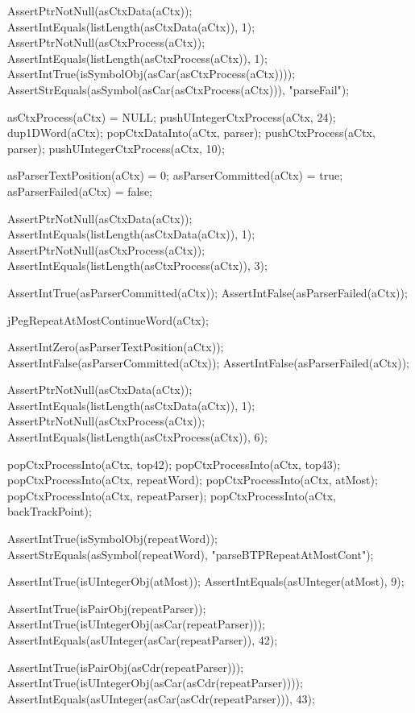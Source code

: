   AssertPtrNotNull(asCtxData(aCtx));
  AssertIntEquals(listLength(asCtxData(aCtx)), 1);
  AssertPtrNotNull(asCtxProcess(aCtx));
  AssertIntEquals(listLength(asCtxProcess(aCtx)), 1);
  AssertIntTrue(isSymbolObj(asCar(asCtxProcess(aCtx))));
  AssertStrEquals(asSymbol(asCar(asCtxProcess(aCtx))), "parseFail");
\stopCTest
\stopTestCase

\startCTest
  asCtxProcess(aCtx) = NULL;
  pushUIntegerCtxProcess(aCtx, 24);
  dup1DWord(aCtx);
  popCtxDataInto(aCtx, parser);
  pushCtxProcess(aCtx, parser);
  pushUIntegerCtxProcess(aCtx, 10);

  asParserTextPosition(aCtx) = 0;
  asParserCommitted(aCtx)    = true;
  asParserFailed(aCtx)       = false;
  
  AssertPtrNotNull(asCtxData(aCtx));
  AssertIntEquals(listLength(asCtxData(aCtx)), 1);
  AssertPtrNotNull(asCtxProcess(aCtx));
  AssertIntEquals(listLength(asCtxProcess(aCtx)), 3);
  
  AssertIntTrue(asParserCommitted(aCtx));
  AssertIntFalse(asParserFailed(aCtx));
  
  jPegRepeatAtMostContinueWord(aCtx);
  
  AssertIntZero(asParserTextPosition(aCtx));
  AssertIntFalse(asParserCommitted(aCtx));
  AssertIntFalse(asParserFailed(aCtx));
  
  AssertPtrNotNull(asCtxData(aCtx));
  AssertIntEquals(listLength(asCtxData(aCtx)), 1);
  AssertPtrNotNull(asCtxProcess(aCtx));
  AssertIntEquals(listLength(asCtxProcess(aCtx)), 6);
    
  popCtxProcessInto(aCtx, top42);
  popCtxProcessInto(aCtx, top43);
  popCtxProcessInto(aCtx, repeatWord);
  popCtxProcessInto(aCtx, atMost);
  popCtxProcessInto(aCtx, repeatParser);
  popCtxProcessInto(aCtx, backTrackPoint);
  
  AssertIntTrue(isSymbolObj(repeatWord));
  AssertStrEquals(asSymbol(repeatWord), "parseBTPRepeatAtMostCont");
  
  AssertIntTrue(isUIntegerObj(atMost));
  AssertIntEquals(asUInteger(atMost), 9);
  
  AssertIntTrue(isPairObj(repeatParser));
  AssertIntTrue(isUIntegerObj(asCar(repeatParser)));
  AssertIntEquals(asUInteger(asCar(repeatParser)), 42);
  
  AssertIntTrue(isPairObj(asCdr(repeatParser)));
  AssertIntTrue(isUIntegerObj(asCar(asCdr(repeatParser))));
  AssertIntEquals(asUInteger(asCar(asCdr(repeatParser))), 43);
  
